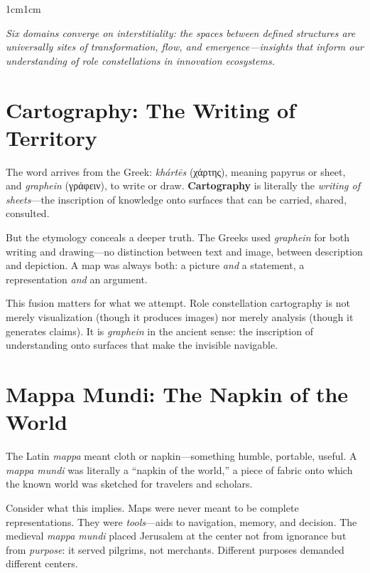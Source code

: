\documentclass[../main.tex]{subfiles}
\begin{document}
\begin{adjustwidth}{1cm}{1cm}
\begin{center}
\small\textit{Six domains converge on interstitiality: the spaces between defined structures are universally sites of transformation, flow, and emergence---insights that inform our understanding of role constellations in innovation ecosystems.}\normalsize
\end{center}

\vspace{1cm}

\section*{Cartography: The Writing of Territory}

The word arrives from the Greek: \textit{khártēs} (χάρτης), meaning papyrus or sheet, and \textit{graphein} (γράφειν), to write or draw. \textbf{Cartography} is literally the \textit{writing of sheets}---the inscription of knowledge onto surfaces that can be carried, shared, consulted.

But the etymology conceals a deeper truth. The Greeks used \textit{graphein} for both writing and drawing---no distinction between text and image, between description and depiction. A map was always both: a picture \textit{and} a statement, a representation \textit{and} an argument.

This fusion matters for what we attempt. Role constellation cartography is not merely visualization (though it produces images) nor merely analysis (though it generates claims). It is \textit{graphein} in the ancient sense: the inscription of understanding onto surfaces that make the invisible navigable.

\vspace{0.8cm}

\section*{Mappa Mundi: The Napkin of the World}

The Latin \textit{mappa} meant cloth or napkin---something humble, portable, useful. A \textit{mappa mundi} was literally a ``napkin of the world,'' a piece of fabric onto which the known world was sketched for travelers and scholars.

Consider what this implies. Maps were never meant to be complete representations. They were \textit{tools}---aids to navigation, memory, and decision. The medieval \textit{mappa mundi} placed Jerusalem at the center not from ignorance but from \textit{purpose}: it served pilgrims, not merchants. Different purposes demanded different centers.


\end{adjustwidth}
\end{document}
